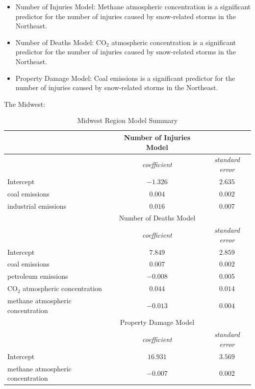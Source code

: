 \documentclass[10pt,]{article}
\begin{document}
\begin{itemize}
  \item Number of Injuries Model: Methane atmospheric concentration is a significant predictor for the number of injuries caused by snow-related storms in the Northeast.
  \item Number of Deaths Model: CO$_2$ atmospheric concentration is a significant predictor for the number of injuries caused by snow-related storms in the Northeast.
  \item Property Damage Model: Coal emissions is a significant predictor for the number of injuries caused by snow-related storms in the Northeast.
\end{itemize}

\newpage

The Midwest:

\begin{center}
  \begin{table}[H]
  \caption{\label{tab:table-name}Midwest Region Model Summary}
  \smallskip
  \begin{center}
  \begin{tabular}{|l c c|}
  \hline
   & Number of Injuries Model & \\
  \hline\hline
   & \textit{coefficient} & \textit{standard error} \\ [0.5ex] 
  \hline
  Intercept & $-1.326$ & $2.635$ \\ 
  \hline
  coal emissions & $0.004$ & $0.002$ \\
  \hline
  industrial emissions & $0.016$ & $0.007$ \\
  \hline\hline
   & Number of Deaths Model & \\
  \hline\hline
   & \textit{coefficient} & \textit{standard error} \\ [0.5ex] 
  \hline
  Intercept & $7.849$ & $2.859$ \\ 
  \hline
  coal emissions & $0.007$ & $0.002$ \\
  \hline
  petroleum emissions & $-0.008$ & $0.005$ \\
  \hline
  CO$_2$ atmospheric concentration & $0.044$ & $0.014$ \\
  \hline
  methane atmospheric concentration & $-0.013$ & $0.004$ \\
  \hline\hline
   & Property Damage Model & \\
  \hline\hline
   & \textit{coefficient} & \textit{standard error} \\ [0.5ex] 
  \hline
  Intercept & $16.931$ & $3.569$ \\ 
  \hline
  methane atmospheric concentration & $-0.007$ & $0.002$ \\
  \hline
  \end{tabular}
  \end{center}
  \end{table}
\end{center}
\end{document}
